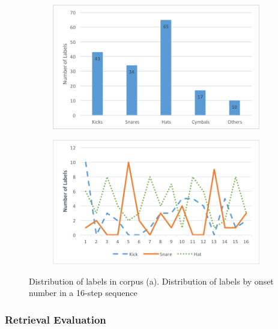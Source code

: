 \begin{figure}
\centering
\begin{subfigure}[b]{0.75\textwidth}
   \includegraphics[width=1\linewidth]{ch07_evaluation/figures/corpus_distribution.png}
   \caption{}
   \label{fig:distrib1} 
\end{subfigure}

\begin{subfigure}[b]{0.75\textwidth}
   \includegraphics[width=1\linewidth]{ch07_evaluation/figures/target_distribution.png}
   \caption{}
   \label{fig:distrib2}
\end{subfigure}

\caption[Distribution of Labels in Breakbeat Collection]{Distribution of labels in corpus (a). Distribution of labels by onset number in a 16-step sequence}
\end{figure}

\subsubsection{Retrieval Evaluation}

